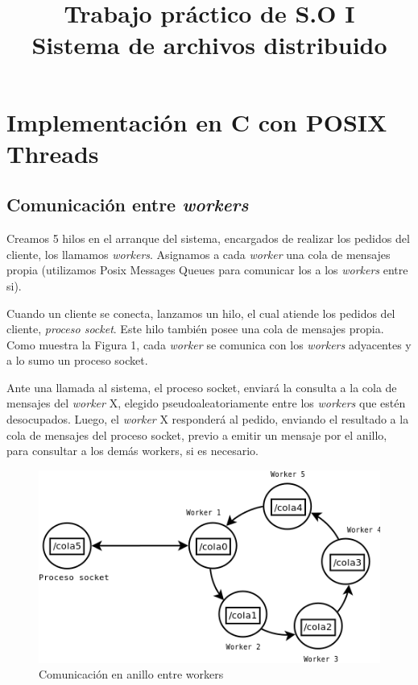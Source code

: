 \documentclass[a4paper, 8pt]{article}
\title{Trabajo práctico de S.O I \\ Sistema de archivos distribuido}
\begin{document}
\maketitle

\section{Implementación en C con POSIX Threads}

\subsection{Comunicación entre \textit{workers}}

Creamos 5 hilos en el arranque del sistema, encargados de realizar los pedidos del cliente, los llamamos \textit{workers}.
Asignamos a cada \textit{worker} una cola de mensajes propia (utilizamos Posix Messages Queues para comunicar los a los \textit{workers} entre si).

Cuando un cliente se conecta, lanzamos un hilo, el cual atiende los pedidos del cliente, \textit{proceso socket}.
Este hilo también posee una cola de mensajes propia.
Como muestra la Figura 1, cada \textit{worker} se comunica con los \textit{workers} adyacentes y a lo sumo un proceso socket.


Ante una llamada al sistema, el proceso socket, enviará la consulta a la cola de mensajes del \textit{worker} X, elegido pseudoaleatoriamente
entre los \textit{workers} que estén desocupados.
Luego, el \textit{worker} X responderá al pedido, enviando el resultado a la cola de mensajes del proceso socket,
previo a emitir un mensaje por el anillo, para consultar a los demás workers, si es necesario.


 \begin{figure}[htbp]
   \centering
     \includegraphics[scale=0.75]{dia1.png}
     \caption{Comunicación en anillo entre workers}
   \label{Figura 1}
 \end{figure}
\end{document}
